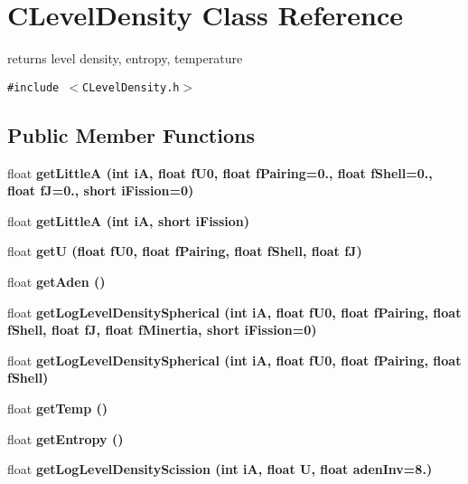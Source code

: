 \section{CLevel\-Density Class Reference}
\label{classCLevelDensity}
returns level density, entropy, temperature  


{\tt \#include $<$CLevel\-Density.h$>$}

\subsection*{Public Member Functions}
\begin{CompactItemize}
\item 
float \bf{get\-Little\-A} (int i\-A, float f\-U0, float f\-Pairing=0., float f\-Shell=0., float f\-J=0., short i\-Fission=0)
\item 
float \bf{get\-Little\-A} (int i\-A, short i\-Fission)
\item 
float \bf{get\-U} (float f\-U0, float f\-Pairing, float f\-Shell, float f\-J)
\item 
float \bf{get\-Aden} ()
\item 
float \bf{get\-Log\-Level\-Density\-Spherical} (int i\-A, float f\-U0, float f\-Pairing, float f\-Shell, float f\-J, float f\-Minertia, short i\-Fission=0)
\item 
float \bf{get\-Log\-Level\-Density\-Spherical} (int i\-A, float f\-U0, float f\-Pairing, float f\-Shell)
\item 
float \bf{get\-Temp} ()
\item 
float \bf{get\-Entropy} ()
\item 
float \bf{get\-Log\-Level\-Density\-Scission} (int i\-A, float U, float aden\-Inv=8.)
\end{CompactItemize}
